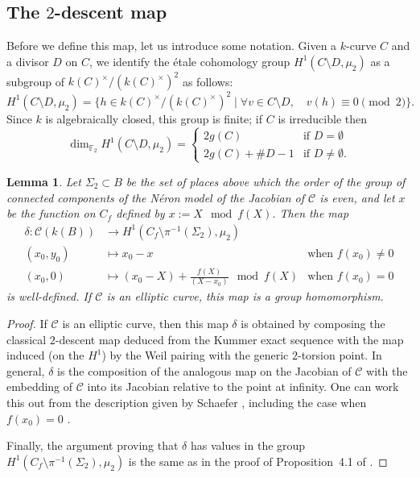 \documentclass[11pt]{article}
\newcommand{\F}{\ensuremath{\mathbb{F}}}
\theoremstyle{plain}
\newtheorem{lemma}[theorem]{Lemma}
\theoremstyle{definition}
\begin{document}

\subsection{The $2$-descent map}

Before we define this map, let us introduce some notation. Given a $k$-curve $C$ and a divisor $D$ on $C$, we identify the {\'e}tale cohomology group $H^1(C\setminus D,\mu_2)$ as a subgroup of $k(C)^\times/(k(C)^\times)^2$ as follows:
$$
H^1(C\setminus D,\mu_2)=\{h\in k(C)^\times/(k(C)^\times)^2 \mid \forall v\in C\setminus D,\quad v(h)\equiv 0\pmod{2}\}.
$$
Since $k$ is algebraically closed, this group is finite; if $C$ is irreducible then
$$
\dim_{\F_2} H^1(C\setminus D,\mu_2) =
\begin{cases}
  2g(C) &\text{if~$D=\emptyset$}\\
  2g(C)+\#D-1 &\text{if~$D\neq \emptyset$}.
\end{cases}
$$

\begin{lemma}
\label{lem:descentmap}
Let $\Sigma_2\subset B$ be the set of places above which the order of the group of connected components of the N\'eron model of the Jacobian of $\mathcal{C}$ is even, and let $x$ be the function on $C_f$ defined by $x:=X\mod{f(X)}$. Then the map
\begin{align*}
\delta: \mathcal{C}(k(B)) &\longrightarrow H^1(C_f\setminus \pi^{-1}(\Sigma_2),\mu_2) \\
(x_0,y_0) &\longmapsto x_0-x & \text{when $f(x_0)\neq 0$}\\
(x_0,0) &\longmapsto (x_0-X) + \frac{f(X)}{(X-x_0)} \mod{f(X)} & \text{when $f(x_0)=0$}
\end{align*}
is well-defined. If $\mathcal{C}$ is an elliptic curve, this map is a group homomorphism.
\end{lemma}


\begin{proof}%
If $\mathcal{C}$ is an elliptic curve, then this map $\delta$ is obtained by composing the classical $2$-descent map deduced from the Kummer exact sequence with the map induced (on the $H^1$) by the Weil pairing with the generic $2$-torsion point. In general, $\delta$ is the composition of the analogous map on the Jacobian of $\mathcal{C}$ with the embedding of $\mathcal{C}$ into its Jacobian relative to the point at infinity. One can work this out from the description given by Schaefer \cite[Theorem~1.2]{schaefer95}, including the case when $f(x_0)=0$ \cite[Lemma~2.2]{schaefer95}.

Finally, the argument proving that $\delta$ has values in the group $H^1(C_f\setminus \pi^{-1}(\Sigma_2),\mu_2)$ is the same as in the proof of Proposition~4.1 of \cite{GHL23}.
\end{proof}
\end{document}
